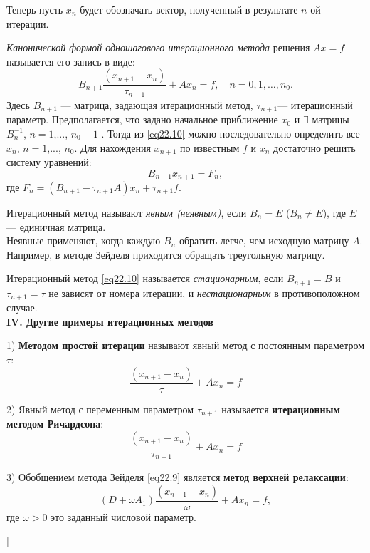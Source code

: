 \par Теперь пусть $x_{n}$ будет обозначать вектор, полученный в результате $n$-ой итерации. 
\par {} \textit{Канонической формой одношагового итерационного метода} решения $Ax=f$ называется его запись в виде: 
\begin{equation} \label{eq22.10}
    B_{n+1}\frac{\left( x_{n+1}-x_{n}\right)}{\tau _{n+1}}+Ax_{n}=f, \quad n = 0, 1, \ldots, n_0.
\end{equation}
Здесь $B_{n+1}$ — матрица, задающая итерационный метод, $\tau _{n+1}$— итерационный параметр. Предполагается, что задано начальное приближение $x_{0}$ и $\exists$ матрицы $B_{n}^{-1}$, $n=1$,..., $n_{0}-1$ . Тогда из \eqref{eq22.10} можно последовательно определить все $x_{n}$, $n=1$,..., $n_{0}$. Для нахождения $x_{n+1}$ по известным $f$ и $x_{n}$ достаточно решить систему уравнений: 
$$B_{n+1}x_{n+1}=F_{n},$$ 
где $F_{n}=\left( B_{n+1}-\tau_{n+1}A\right)x_{n}+\tau_{n+1}f$. \\

\par {} Итерационный метод называют \textit{явным (неявным)}, если $B_{n}=E$
($B_{n}\neq E$), где $E$— единичная матрица. \\

Неявные применяют, когда каждую $B_{n}$ обратить легче, чем исходную матрицу $A$. Например, в методе Зейделя приходится обращать треугольную матрицу.\\

\par {} Итерационный метод \eqref{eq22.10} называется \textit{стационарным}, если $B_{n+1}=B$ и $\tau_{n+1}=\tau$ не зависят от номера итерации, и \textit{нестационарным} в противоположном случае.\\

\textbf{IV. Другие примеры итерационных методов}

\par 1) \textbf{Методом простой итерации} называют явный метод с постоянным параметром $\tau$:
$$\frac{\left( x_{n+1}-x_{n}\right)}{\tau}+Ax_{n}=f$$ 
\par 2) Явный метод с переменным параметром $\tau_{n+1}$ называется \textbf{итерационным методом Ричардсона}:
$$\frac{\left( x_{n+1}-x_{n}\right)}{\tau_{n+1}}+Ax_{n}=f$$ 
\par 3) Обобщением метода Зейделя \eqref{eq22.9} является \textbf{метод верхней релаксации}: 
$$\left( D+\omega A_{1}\right)\frac{\left( x_{n+1}-x_{n}\right)}{\omega}+Ax_n=f,$$ 
где $\omega>0$ это заданный числовой параметр.

\bigbreak
[\cite[pages 82-85]{chm_samarski_gulin}]
